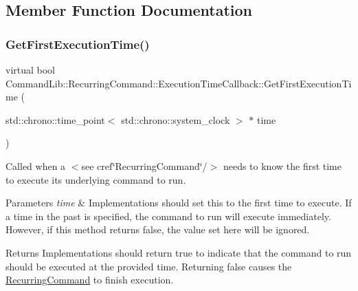 \subsection{Member Function Documentation}
\mbox{\label{class_command_lib_1_1_recurring_command_1_1_execution_time_callback_a5fb9cdbbbcab94a9e4578e0aeaabaa60}} 
\subsubsection{\texorpdfstring{Get\+First\+Execution\+Time()}{GetFirstExecutionTime()}}
{\footnotesize\ttfamily virtual bool Command\+Lib\+::\+Recurring\+Command\+::\+Execution\+Time\+Callback\+::\+Get\+First\+Execution\+Time (\begin{DoxyParamCaption}\item[{std\+::chrono\+::time\+\_\+point$<$ std\+::chrono\+::system\+\_\+clock $>$ $\ast$}]{time }\end{DoxyParamCaption})\hspace{0.3cm}{\ttfamily [pure virtual]}}



Called when a $<$see cref\char`\"{}\+Recurring\+Command\char`\"{}/$>$ needs to know the first time to execute its underlying command to run. 


\begin{DoxyParams}{Parameters}
{\em time} & Implementations should set this to the first time to execute. If a time in the past is specified, the command to run will execute immediately. However, if this method returns false, the value set here will be ignored. \\
\hline
\end{DoxyParams}
\begin{DoxyReturn}{Returns}
Implementations should return true to indicate that the command to run should be executed at the provided time. Returning false causes the \mbox{\hyperlink{class_command_lib_1_1_recurring_command}{Recurring\+Command}} to finish execution. 
\end{DoxyReturn}
\mbox{\label{class_command_lib_1_1_recurring_command_1_1_execution_time_callback_a8ca133b8122f1bf1051bc063a8f67a13}} 
